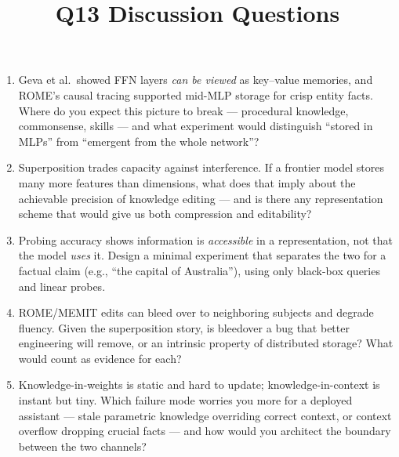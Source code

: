 \documentclass[11pt]{article}
\title{Q13 Discussion Questions}
\date{}
\begin{document}
\maketitle
\begin{enumerate}[noitemsep]
\item Geva et al.\ showed FFN layers \emph{can be viewed} as key--value memories, and ROME's causal tracing supported mid-MLP storage for crisp entity facts. Where do you expect this picture to break --- procedural knowledge, commonsense, skills --- and what experiment would distinguish ``stored in MLPs'' from ``emergent from the whole network''?
\item Superposition trades capacity against interference. If a frontier model stores many more features than dimensions, what does that imply about the achievable precision of knowledge editing --- and is there any representation scheme that would give us both compression and editability?
\item Probing accuracy shows information is \emph{accessible} in a representation, not that the model \emph{uses} it. Design a minimal experiment that separates the two for a factual claim (e.g., ``the capital of Australia''), using only black-box queries and linear probes.
\item ROME/MEMIT edits can bleed over to neighboring subjects and degrade fluency. Given the superposition story, is bleedover a bug that better engineering will remove, or an intrinsic property of distributed storage? What would count as evidence for each?
\item Knowledge-in-weights is static and hard to update; knowledge-in-context is instant but tiny. Which failure mode worries you more for a deployed assistant --- stale parametric knowledge overriding correct context, or context overflow dropping crucial facts --- and how would you architect the boundary between the two channels?
\end{enumerate}
\end{document}
